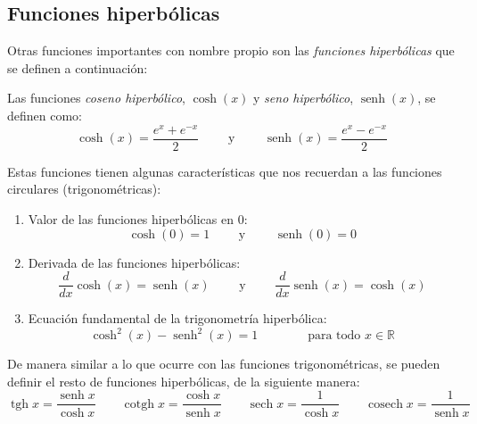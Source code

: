 
\subsection{Funciones hiperbólicas}\label{FuncHiperb}

Otras funciones importantes con nombre propio son las \emph{funciones hiperbólicas} que se definen a continuación:


Las funciones \emph{coseno hiperbólico}, $\cosh(x)$ y \emph{seno hiperbólico}, $\operatorname{senh}(x)$, se definen como:
\[
\cosh(x)=\frac{e^x+e^{-x}}2
\qquad\mbox{ y }\qquad
\operatorname{senh}(x)=\frac{e^x-e^{-x}}2
\]





Estas funciones tienen algunas características que nos recuerdan a las funciones circulares (trigonométricas):
\begin{enumerate}
\item
Valor de las funciones hiperbólicas en $0$:
\[
\cosh(0)=1
\qquad\mbox{ y }\qquad
\operatorname{senh}(0)=0
\]
\item
Derivada de las funciones hiperbólicas:
\[
\frac{d}{dx}\cosh(x)=\operatorname{senh}(x)
\qquad\mbox{ y }\qquad
\frac{d}{dx}\operatorname{senh}(x)=\cosh(x)
\]
\item
Ecuación fundamental de la trigonometría hiperbólica:
\[
\cosh^2(x)-\operatorname{senh}^2(x)=1 \qquad\qquad\mbox{para todo } x\in\mathbb{R}
\]
\end{enumerate}

De manera similar a lo que ocurre con las funciones trigonométricas, se pueden definir el resto de funciones hiperbólicas, de la siguiente manera:
\[
\operatorname{tgh} x=\dfrac{\operatorname{senh} x}{\cosh x}
\qquad
\operatorname{cotgh} x=\dfrac{\cosh x}{\operatorname{senh} x}
\qquad
\operatorname{sech} x =\dfrac1{\cosh x}
\qquad
\operatorname{cosech} x =\dfrac1{\operatorname{senh} x}
\]




